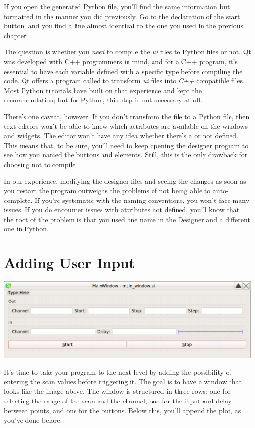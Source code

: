 If you open the generated Python file, you'll find the same information but formatted in the manner you did previously. Go to the declaration of the start button, and you find a line almost identical to the one you used in the previous chapter:


The question is whether you \emph{need} to compile the \textit{ui} files to Python files or not. Qt was developed with C++ programmers in mind, and for a C++ program, it's essential to have each variable defined with a specific type before compiling the code. Qt offers a program called  to transform \textit{ui} files into \textit{C++} compatible files. Most Python tutorials have built on that experience and kept the recommendation; but for Python, this step is not necessary at all.

There's one caveat, however. If you don't transform the file to a Python file, then text editors won't be able to know which attributes are available on the windows and widgets. The editor won't have any idea whether there's a  or not defined. This means that, to be sure, you'll need to keep opening the designer program to see how you named the buttons and elements. Still, this is the only drawback for choosing not to compile.

In our experience, modifying the designer files and seeing the changes as soon as you restart the program outweighs the problems of not being able to auto-complete. If you're systematic with the naming conventions, you won't face many issues. If you do encounter issues with attributes not defined, you'll know that the root of the problem is that you used one name in the Designer and a different one in Python.

\section{Adding User Input}\label{sec:adding-user-input}
\begin{center}
    \includegraphics[width=.5\textwidth]{images/Chapter_09/08_final_window_example.png}
\end{center}

It's time to take your program to the next level by adding the possibility of entering the scan values before triggering it. The goal is to have a window that looks like the image above. The window is structured in three rows: one for selecting the range of the scan and the channel, one for the input and delay between points, and one for the buttons. Below this, you'll append the plot, as you've done before.

